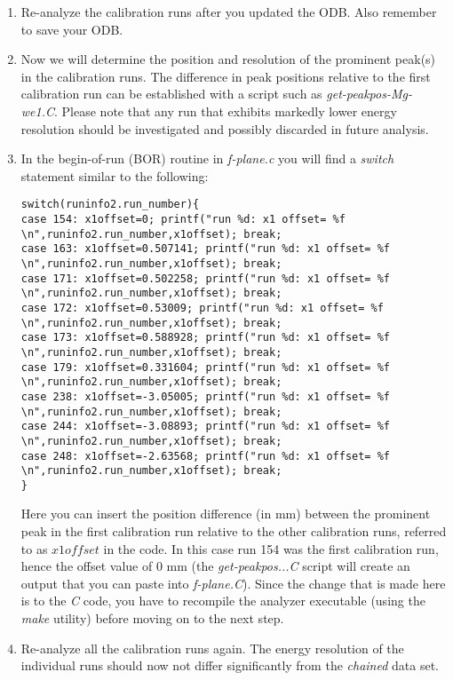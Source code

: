 \documentclass[11pt]{report}
\begin{document}
\begin{enumerate}
\item 
Re-analyze the calibration runs after you updated the ODB. 
Also remember to save your ODB.

\item Now we will determine the position and resolution of the prominent peak(s) in the calibration runs.
The difference in peak positions relative to the first calibration run can be established with 
a script such as {\it get-peakpos-Mg-we1.C}.
Please note that any run that exhibits markedly lower energy resolution should be investigated 
and possibly discarded in future analysis.

\item In the begin-of-run (BOR) routine in {\it f-plane.c} you will find a {\it switch} statement similar 
to the following:
\begin{verbatim} 
switch(runinfo2.run_number){
case 154: x1offset=0; printf("run %d: x1 offset= %f \n",runinfo2.run_number,x1offset); break;   
case 163: x1offset=0.507141; printf("run %d: x1 offset= %f \n",runinfo2.run_number,x1offset); break;   
case 171: x1offset=0.502258; printf("run %d: x1 offset= %f \n",runinfo2.run_number,x1offset); break;   
case 172: x1offset=0.53009; printf("run %d: x1 offset= %f \n",runinfo2.run_number,x1offset); break;   
case 173: x1offset=0.588928; printf("run %d: x1 offset= %f \n",runinfo2.run_number,x1offset); break;   
case 179: x1offset=0.331604; printf("run %d: x1 offset= %f \n",runinfo2.run_number,x1offset); break;   
case 238: x1offset=-3.05005; printf("run %d: x1 offset= %f \n",runinfo2.run_number,x1offset); break;   
case 244: x1offset=-3.08893; printf("run %d: x1 offset= %f \n",runinfo2.run_number,x1offset); break;   
case 248: x1offset=-2.63568; printf("run %d: x1 offset= %f \n",runinfo2.run_number,x1offset); break;  
}
\end{verbatim}
Here you can insert the position difference (in mm) between the prominent peak in the first calibration
run relative to the other calibration runs, referred to as $x1offset$ in the code. 
In this case run 154 was the first calibration run,
hence the offset value of 0 mm  (the {\it get-peakpos...C} script will create an output that
you can paste into {\it f-plane.C}).
Since the change that is made here is to the {\it C} code, you have to recompile the analyzer executable
(using the {\it make} utility)
before moving on to the next step.

\item Re-analyze all the calibration runs again. 
The energy resolution of the individual runs
should now not differ significantly from the {\it chained} data set. 


\end{enumerate}
\end{document}
